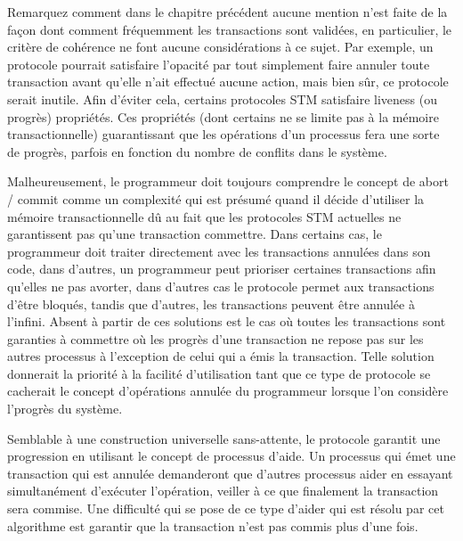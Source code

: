 Remarquez comment dans le chapitre précédent aucune mention n'est faite de la façon dont comment fréquemment les transactions sont validées, en particulier, le critère de cohérence ne font aucune considérations à ce sujet.
Par exemple, un protocole pourrait satisfaire l'opacité par tout simplement faire annuler toute transaction avant qu'elle n'ait effectué aucune action, mais bien sûr, ce protocole serait inutile.
Afin d'éviter cela, certains protocoles STM satisfaire liveness (ou progrès) propriétés.
Ces propriétés (dont certains ne se limite pas à la mémoire transactionnelle) guarantissant que les opérations d'un processus fera une sorte de progrès, parfois en fonction du nombre de conflits dans le système.






Malheureusement, le programmeur doit toujours comprendre le concept de abort / commit comme un complexité qui
est présumé quand il décide d'utiliser la mémoire transactionnelle dû au fait que les protocoles STM actuelles ne garantissent pas qu'une transaction commettre.
Dans certains cas, le programmeur doit traiter directement avec les transactions annulées dans son code,
dans d'autres, un programmeur peut prioriser certaines transactions afin qu'elles ne pas avorter, dans d'autres cas le protocole permet aux transactions d'être bloqués,
tandis que d'autres, les transactions peuvent être annulée à l'infini.
Absent à partir de ces solutions est le cas où toutes les transactions sont garanties à commettre où les
progrès d'une transaction ne repose pas sur les autres processus à l'exception de celui qui a émis la transaction.
Telle solution donnerait la priorité à la facilité d'utilisation tant que ce type de protocole se cacherait le concept d'opérations annulée du programmeur lorsque l'on considère l'progrès du système.



Semblable à une construction universelle sans-attente, le protocole garantit une progression en utilisant le concept de processus d'aide.
Un processus qui émet une transaction qui est annulée demanderont que d'autres processus aider en essayant simultanément d'exécuter l'opération, veiller à ce que finalement la transaction sera commise.
Une difficulté qui se pose de ce type d'aider qui est résolu par cet algorithme est garantir que la transaction n'est pas commis plus d'une fois.



